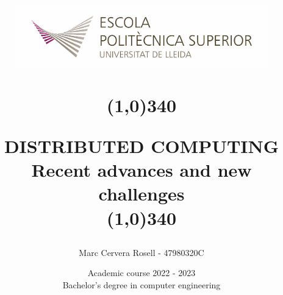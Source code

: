 \title{
	\begin{center}
	\vspace{3cm}
	\includegraphics[width=11cm, height=3cm]{Images/Logo-nou-eps.jpg}
	\end{center}
	\begin{center}
	\line(1,0){340}
	\end{center}		
	DISTRIBUTED COMPUTING\\
	\vspace{2mm}
	\Large Recent advances and new challenges \\
	\line(1,0){340}
	\vspace{2.5cm}
	}

\author{Marc Cervera Rosell - 47980320C \vspace{1cm}}


\date{Academic course 2022 - 2023\vspace{0.5cm} \\Bachelor's degree in computer engineering}